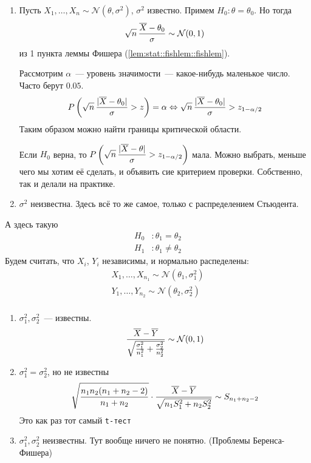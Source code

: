 \documentclass[12pt,timbord]{../../../notes}
\begin{document}
\begin{enumerate}
  \item Пусть $X_1, \dotsc, X_n \sim \mathcal N(\theta,\sigma^2)$, $\sigma^2$ известно.
    Примем $H_0 \colon \theta = \theta_0$. Но тогда \[
      \sqrt n\, \frac{\overline{X} -\theta_0}{\sigma}\sim \mathcal N(0,1)
    \]
    из 1 пункта леммы Фишера (\ref{lem:stat::fishlem::fishlem}). 

    Рассмотрим $\alpha$~--- уровень значимости~--- какое-нибудь маленькое число. 
    Часто берут $0.05$. 
    \[
      P\left(\sqrt n\, \frac{|\overline{X} -\theta_0|}{\sigma} > z \right) = \alpha \Leftrightarrow 
      \sqrt n\, \frac{|\overline{X} -\theta_0|}{\sigma} > z_{1-\alpha/2}
    \]
    Таким образом можно найти границы критической области. 

    Если $H_0$ верна, то $\displaystyle P\left(\sqrt n\, \frac{|\overline{X} - \theta|}{\sigma} >
    z_{1-\alpha/2}\right)$ мала. Можно выбрать, меньше чего мы хотим её сделать, и объявить сие
      критерием проверки. Собственно, так и делали на практике.
  \item $\sigma^2$ неизвестна. Здесь всё то же самое, только с распределением Стьюдента. 
\end{enumerate}
А здесь такую
\[
  \begin{split}
    H_0 & \colon \theta_1 = \theta_2 \\
    H_1 & \colon \theta_1 \neq \theta_2 
  \end{split} 
\]
Будем считать, что $X_i$, $Y_i$ независимы, и нормально распеделены:\[
  \begin{split}
    X_1, \dotsc, X_{n_1} \sim \mathcal N (\theta_1, \sigma_1^2) \\
    Y_1, \dotsc, Y_{n_2} \sim \mathcal N(\theta_2, \sigma_2^2) \\
  \end{split}
\]
\begin{enumerate}
  \item $\sigma_1^2, \sigma_2^2$~--- известны.
    \[
      \frac{\overline{X} - \overline{Y}}{\sqrt{\frac{\sigma_1^2}{n_1^2} + \frac{\sigma_2^2}{n_2^2} }} \sim
      \mathcal N (0,1) 
    \]
  \item $\sigma_1^2 = \sigma_2^2$, но не известны
    \[
      \sqrt{\frac{n_1n_2(n_1 + n_2  -2)}{n_1 + n_2} } \cdot \frac{\overline{X} - \overline{Y}}{\sqrt{n_1 S_1^2
      + n_2 S_2^2}} \sim S_{n_1 + n_2 - 2}
    \]
    Это как раз тот самый \texttt{t-тест}
  \item $\sigma_1^2, \sigma_2^2$ неизвестны. Тут вообще ничего не понятно. (Проблемы
    Беренса-Фишера)
\end{enumerate}
\end{document}
